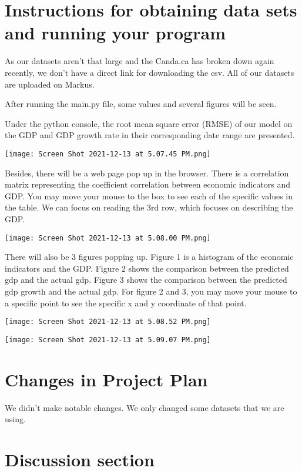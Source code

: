 \documentclass{article}
\begin{document}
\section{Instructions for obtaining data sets and running your program}  
As our datasets aren’t that large and the Canda.ca has broken down again recently, we don’t have a direct link for downloading the csv. All of our datasets are uploaded on Markus. 

After running the main.py file, some values and several figures will be seen. 

Under the python console, the root mean square error (RMSE) of our model on the GDP and GDP growth rate in their corresponding date range are presented.


\texttt{[image: Screen Shot 2021-12-13 at 5.07.45 PM.png]}


Besides, there will be a web page pop up in the browser. There is a correlation matrix representing the coefficient correlation between economic indicators and GDP. You may move your mouse to the box to see each of the specific values in the table. We can focus on reading the 3rd row, which focuses on describing the GDP. 

\texttt{[image: Screen Shot 2021-12-13 at 5.08.00 PM.png]}


There will also be 3 figures popping up. Figure 1 is a histogram of the economic indicators and the GDP. Figure 2 shows the comparison between the predicted gdp and the actual gdp. Figure 3 shows the comparison between the predicted gdp growth and the actual gdp. For figure 2 and 3, you may move your mouse to a specific point to see the specific x and y coordinate of that point. 


\texttt{[image: Screen Shot 2021-12-13 at 5.08.52 PM.png]}


\texttt{[image: Screen Shot 2021-12-13 at 5.09.07 PM.png]}


\section{Changes in Project Plan}  
We didn’t make notable changes. We only changed some datasets that we are using. 

\section{Discussion section}  
\end{document}
